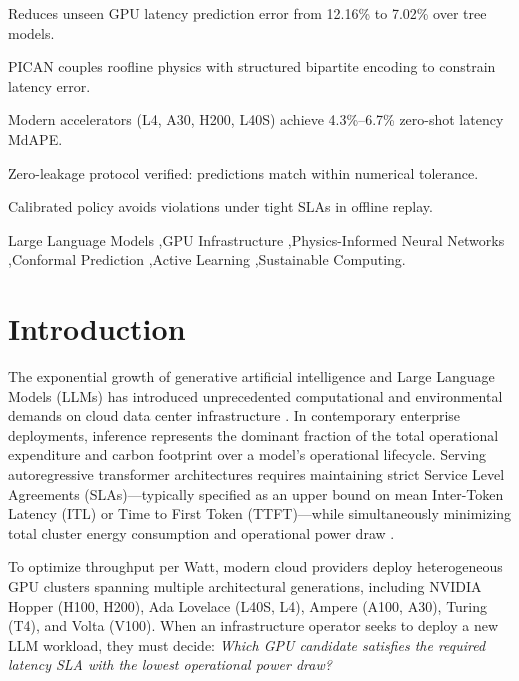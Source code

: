 \documentclass[preprint,12pt]{elsarticle}
\begin{document}
\begin{frontmatter}
\begin{highlights}
\item Reduces unseen GPU latency prediction error from 12.16\% to 7.02\% over tree models.
\item PICAN couples roofline physics with structured bipartite encoding to constrain latency error.
\item Modern accelerators (L4, A30, H200, L40S) achieve 4.3\%--6.7\% zero-shot latency MdAPE.
\item Zero-leakage protocol verified: predictions match within numerical tolerance.
\item Calibrated policy avoids violations under tight SLAs in offline replay.
\end{highlights}

\begin{keyword}
Large Language Models \sep GPU Infrastructure \sep Physics-Informed Neural Networks \sep Conformal Prediction \sep Active Learning \sep Sustainable Computing.
\end{keyword}

\end{frontmatter}

\linenumbers

\section{Introduction}
\label{sec:intro}

The exponential growth of generative artificial intelligence and Large Language Models (LLMs) has introduced unprecedented computational and environmental demands on cloud data center infrastructure \citep{strubell2019energy, patterson2021carbon, suscom_desislavov2023}. In contemporary enterprise deployments, inference represents the dominant fraction of the total operational expenditure and carbon footprint over a model's operational lifecycle. Serving autoregressive transformer architectures requires maintaining strict Service Level Agreements (SLAs)---typically specified as an upper bound on mean Inter-Token Latency (ITL) or Time to First Token (TTFT)---while simultaneously minimizing total cluster energy consumption and operational power draw \citep{kwon2023vllm, suscom_malekloo2018}.

To optimize throughput per Watt, modern cloud providers deploy heterogeneous GPU clusters spanning multiple architectural generations, including NVIDIA Hopper (H100, H200), Ada Lovelace (L40S, L4), Ampere (A100, A30), Turing (T4), and Volta (V100). When an infrastructure operator seeks to deploy a new LLM workload, they must decide: \textit{Which GPU candidate satisfies the required latency SLA with the lowest operational power draw?}
\end{document}
